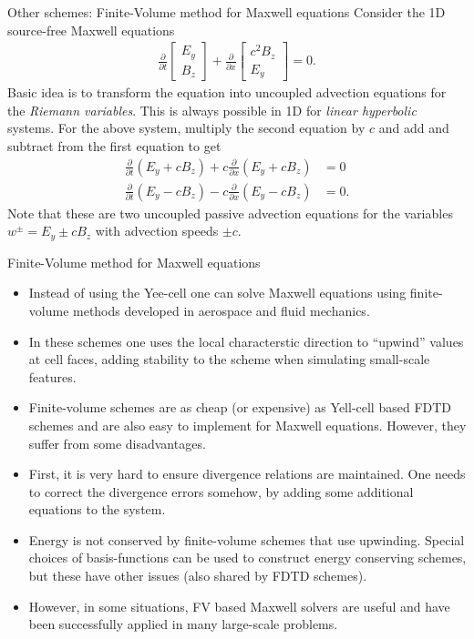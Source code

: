 \documentclass[pdf]{beamer}
\theoremstyle{definition}
\begin{document}
\begin{frame}{Other schemes: Finite-Volume method for Maxwell
    equations}
  \small
  Consider the 1D source-free Maxwell equations
  \begin{align*}
    \frac{\partial }{\partial t}
    \left[
    \begin{matrix}
      E_y \\
      B_z
    \end{matrix}
    \right]
    +
    \frac{\partial }{\partial x}
    \left[
    \begin{matrix}
      c^2B_z \\
      E_y
    \end{matrix}
    \right]
    =
    0.
  \end{align*}
  Basic idea is to transform the equation into uncoupled advection
  equations for the \emph{Riemann variables}. This is always possible
  in 1D for \emph{linear hyperbolic} systems. For the above system,
  multiply the second equation by $c$ and add and subtract from the
  first equation to get
  \begin{align*}
    \frac{\partial }{\partial t}\left(E_y + c B_z\right) + c \frac{\partial }{\partial x}\left(E_y + c B_z\right) &= 0 \\
    \frac{\partial }{\partial t}\left(E_y - c B_z\right) - c \frac{\partial }{\partial x}\left(E_y - c B_z\right) &= 0.
  \end{align*}
  Note that these are two uncoupled passive advection equations for
  the variables $w^\pm = E_y \pm c B_z$ with advection speeds $\pm
  c$.
\end{frame}

\begin{frame}{Finite-Volume method for Maxwell equations}
  \small%
  \begin{itemize}
  \item Instead of using the Yee-cell one can solve Maxwell equations
    using finite-volume methods developed in aerospace and fluid
    mechanics.
  \item In these schemes one uses the local characterstic direction to
    ``upwind'' values at cell faces, adding stability to the scheme
    when simulating small-scale features.
  \item Finite-volume schemes are as cheap (or expensive) as Yell-cell
    based FDTD schemes and are also easy to implement for Maxwell
    equations. However, they suffer from some disadvantages.
  \item First, it is very hard to ensure divergence relations are
    maintained. One needs to correct the divergence errors somehow, by
    adding some additional equations to the system.
  \item Energy is not conserved by finite-volume schemes that use
    upwinding. Special choices of basis-functions can be used to
    construct energy conserving schemes, but these have other issues
    (also shared by FDTD schemes).
  \item However, in some situations, FV based Maxwell solvers are
    useful and have been successfully applied in many large-scale
    problems.
  \end{itemize}
\end{frame}  
\end{document}
